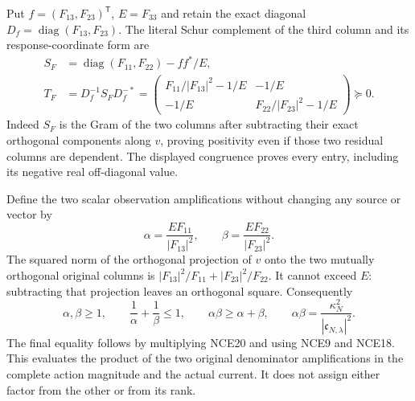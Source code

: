 Put $f=(F_{13},F_{23})^{\mathsf T}$, $E=F_{33}$ and retain the exact
diagonal $D_f=\operatorname{diag}(F_{13},F_{23})$. The literal Schur
complement of the third column and its response-coordinate form are
\[
 \begin{split}
 S_F&=\operatorname{diag}(F_{11},F_{22})-ff^*/E,\\
 T_F&=D_f^{-1}S_FD_f^{-*}
  =\begin{pmatrix}
   F_{11}/|F_{13}|^2-1/E&-1/E\\
   -1/E&F_{22}/|F_{23}|^2-1/E
   \end{pmatrix}\succeq0.
 \end{split}                                                     \tag{NCE19}
\]
Indeed $S_F$ is the Gram of the two columns after subtracting their
exact orthogonal components along $v$, proving positivity even if
those two residual columns are dependent. The displayed congruence
proves every entry, including its negative real off-diagonal value.

Define the two scalar observation amplifications without changing any
source or vector by
\[
 \alpha=\frac{E F_{11}}{|F_{13}|^2},\qquad
 \beta=\frac{E F_{22}}{|F_{23}|^2}.
 \tag{NCE20}
\]
The squared norm of the orthogonal projection of $v$ onto the two
mutually orthogonal original columns is
$|F_{13}|^2/F_{11}+|F_{23}|^2/F_{22}$. It cannot exceed $E$:
subtracting that projection leaves an orthogonal square. Consequently
\[
 \alpha,\beta\ge1,\qquad
 \frac1\alpha+\frac1\beta\le1,\qquad
 \alpha\beta\ge\alpha+\beta,
 \qquad
 \boxed{\alpha\beta=
       \frac{\kappa_N^2}{|\mathfrak c_{N,\lambda}|^2}.}
 \tag{NCE21}
\]
The final equality follows by multiplying NCE20 and using NCE9 and
NCE18. This evaluates the product of the two original denominator
amplifications in the complete action magnitude and the actual current.
It does not assign either factor from the other or from its rank.
